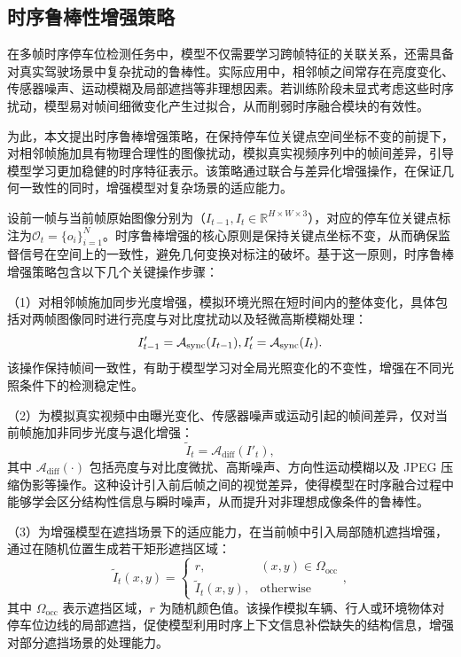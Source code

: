 \subsection{时序鲁棒性增强策略}
在多帧时序停车位检测任务中，模型不仅需要学习跨帧特征的关联关系，还需具备对真实驾驶场景中复杂扰动的鲁棒性。实际应用中，相邻帧之间常存在亮度变化、传感器噪声、运动模糊及局部遮挡等非理想因素。若训练阶段未显式考虑这些时序扰动，模型易对帧间细微变化产生过拟合，从而削弱时序融合模块的有效性。

为此，本文提出时序鲁棒增强策略，在保持停车位关键点空间坐标不变的前提下，对相邻帧施加具有物理合理性的图像扰动，模拟真实视频序列中的帧间差异，引导模型学习更加稳健的时序特征表示。该策略通过联合与差异化增强操作，在保证几何一致性的同时，增强模型对复杂场景的适应能力。

设前一帧与当前帧原始图像分别为（$I_{t-1}, I_t \in \mathbb{R}^{H \times W \times 3}$），对应的停车位关键点标注为$\mathcal{O}_t = \{ o_i \}_{i=1}^{N}$。时序鲁棒增强的核心原则是保持关键点坐标不变，从而确保监督信号在空间上的一致性，避免几何变换对标注的破坏。基于这一原则，时序鲁棒增强策略包含以下几个关键操作步骤：

（1）对相邻帧施加同步光度增强，模拟环境光照在短时间内的整体变化，具体包括对两帧图像同时进行亮度与对比度扰动以及轻微高斯模糊处理：
\begin{equation}
I'_{t-1} = \mathcal{A}_{\text{sync}}(I_{t-1}), \\
I'_{t} = \mathcal{A}_{\text{sync}}(I_{t}).
\end{equation}
该操作保持帧间一致性，有助于模型学习对全局光照变化的不变性，增强在不同光照条件下的检测稳定性。

（2）为模拟真实视频中由曝光变化、传感器噪声或运动引起的帧间差异，仅对当前帧施加非同步光度与退化增强：
\begin{equation}
\tilde{I}_{t} = \mathcal{A}_{\text{diff}}(I'_{t}),
\end{equation}
其中 $\mathcal{A}_{\text{diff}}(\cdot)$ 包括亮度与对比度微扰、高斯噪声、方向性运动模糊以及 JPEG 压缩伪影等操作。这种设计引入前后帧之间的视觉差异，使得模型在时序融合过程中能够学会区分结构性信息与瞬时噪声，从而提升对非理想成像条件的鲁棒性。

（3）为增强模型在遮挡场景下的适应能力，在当前帧中引入局部随机遮挡增强，通过在随机位置生成若干矩形遮挡区域：
\begin{equation}
\tilde{I}_{t}(x, y) =
\begin{cases}
r, & (x,y) \in \Omega_{\text{occ}} \\
\tilde{I}_{t}(x, y), & \text{otherwise}
\end{cases}
,
\end{equation}
其中 $\Omega_{\text{occ}}$ 表示遮挡区域，$r$ 为随机颜色值。该操作模拟车辆、行人或环境物体对停车位边线的局部遮挡，促使模型利用时序上下文信息补偿缺失的结构信息，增强对部分遮挡场景的处理能力。

